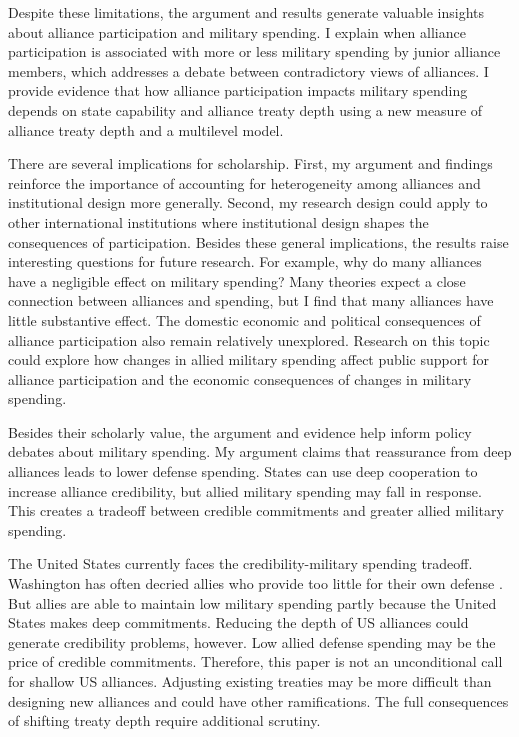 \documentclass[12pt]{article}
\begin{document}
Despite these limitations, the argument and results generate valuable insights about alliance participation and military spending. 
I explain when alliance participation is associated with more or less military spending by junior alliance members, which addresses a debate between contradictory views of alliances.  
I provide evidence that how alliance participation impacts military spending depends on state capability and alliance treaty depth using a new measure of alliance treaty depth and a multilevel model. 


There are several implications for scholarship. 
First, my argument and findings reinforce the importance of accounting for heterogeneity among alliances and institutional design more generally.
Second, my research design could apply to other international institutions where institutional design shapes the consequences of participation.
Besides these general implications, the results raise interesting questions for future research. 
For example, why do many alliances have a negligible effect on military spending? 
Many theories expect a close connection between alliances and spending, but I find that many alliances have little substantive effect.
The domestic economic and political consequences of alliance participation also remain relatively unexplored.
Research on this topic could explore how changes in allied military spending affect public support for alliance participation and the economic consequences of changes in military spending.  


Besides their scholarly value, the argument and evidence help inform policy debates about military spending. 
My argument claims that reassurance from deep alliances leads to lower defense spending. 
States can use deep cooperation to increase alliance credibility, but allied military spending may fall in response. 
This creates a tradeoff between credible commitments and greater allied military spending. 


The United States currently faces the credibility-military spending tradeoff. 
Washington has often decried allies who provide too little for their own defense \citep{Lanoszka2015}. 
But allies are able to maintain low military spending partly because the United States makes deep commitments. 
Reducing the depth of US alliances could generate credibility problems, however. 
Low allied defense spending may be the price of credible commitments.  
Therefore, this paper is not an unconditional call for shallow US alliances. 
Adjusting existing treaties may be more difficult than designing new alliances and could have other ramifications. 
The full consequences of shifting treaty depth require additional scrutiny. 

 



\singlespace
 
 
\end{document}
